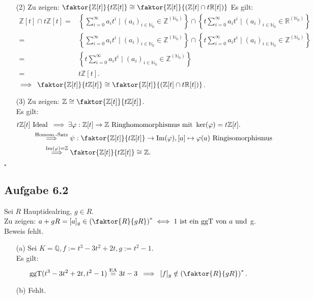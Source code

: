 \documentclass[12pt]{article}
\newcommand{\QED}{\begin{flushright} $\square$ \end{flushright}}
\newcommand{\df}{\enspace\Longrightarrow\enspace}
\newcommand{\gdw}{\;\Longleftrightarrow\;}
\newcommand{\ggT}{\operatorname{ggT}}
\begin{document}
\begin{enumerate}
\begin{enumerate}
		\item[(2)] Zu zeigen: $\faktor{\mathbb{Z}[t]}{t\mathbb{Z}[t]} \cong \faktor{\mathbb{Z}[t]}{(\mathbb{Z}[t] \cap t\mathbb{R}[t])}$
		Es gilt:
		\begin{align*}
			\mathbb{Z}[t]\cap t\mathbb{Z}[t] = &\left\lbrace\sum_{i=0}^{\infty}a_it^i \mid (a_i)_{i\in\mathbb{N}_0}\in\mathbb{Z}^{(\mathbb{N}_0)}\right\rbrace \cap \left\lbrace t\sum_{i=0}^{\infty}a_it^i \mid (a_i)_{i\in\mathbb{N}_0}\in\mathbb{R}^{(\mathbb{N}_0)}\right\rbrace \\
			= &\left\lbrace\sum_{i=0}^{\infty}a_it^i \mid (a_i)_{i\in\mathbb{N}_0}\in\mathbb{Z}^{(\mathbb{N}_0)}\right\rbrace \cap \left\lbrace t\sum_{i=0}^{\infty}a_it^i \mid (a_i)_{i\in\mathbb{N}_0}\in\mathbb{Z}^{(\mathbb{N}_0)}\right\rbrace \\
			= &\left\lbrace t\sum_{i=0}^{\infty}a_it^i \mid (a_i)_{i\in\mathbb{N}_0}\in\mathbb{Z}^{(\mathbb{N}_0)}\right\rbrace \\
			= &t\mathbb{Z}[t].
		\end{align*}
		$\df \faktor{\mathbb{Z}[t]}{t\mathbb{Z}[t]} \cong \faktor{\mathbb{Z}[t]}{(\mathbb{Z}[t] \cap t\mathbb{R}[t])}$.
		
		\item[(3)] Zu zeigen: $\mathbb{Z} \cong \faktor{\mathbb{Z}[t]}{t\mathbb{Z}[t]}$. \\
		Es gilt:
		\begin{align*}
			t\mathbb{Z}[t]\text{ Ideal} \df &\exists\varphi:\mathbb{Z}[t]\rightarrow\mathbb{Z}\text{ Ringhomomorphismus mit }\ker(\varphi)=t\mathbb{Z}[t]. \\
			\overset{\text{Homom.-Satz}}{\df} &\;\psi:\faktor{\mathbb{Z}[t]}{t\mathbb{Z}[t]}\rightarrow\text{Im}(\varphi), [a]\mapsto\varphi(a)\text{ Ringisomorphismus} \\
			\overset{\text{Im}(\varphi)=\mathbb{Z}}{\df} &\;\faktor{\mathbb{Z}[t]}{t\mathbb{Z}[t]}\cong\mathbb{Z}.
		\end{align*}
	\end{enumerate}
	\QED
\end{enumerate}

\subsection*{Aufgabe 6.2}
Sei $R$ Hauptidealring, $g\in R$. \\
Zu zeigen: $a+gR=[a]_g\in\left(\faktor{R}{gR}\right)^*\gdw 1\text{ ist ein $\ggT$ von $a$ und }$g. \\
Beweis fehlt.
\begin{enumerate}
	\item[(a)] Sei $K=\mathbb{Q}, f:=t^3-3t^2+2t,g:=t^2-1$. \\
	Es gilt:
	$$\ggT(t^3-3t^2+2t,t^2-1)\overset{\text{EA}}{=}3t-3 \df [f]_g\notin\left(\faktor{R}{gR}\right)^*.$$
	
	
	\item[(b)] Fehlt.
\end{enumerate}
\end{document}
